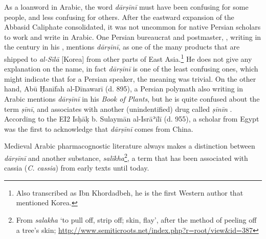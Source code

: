 As a loanword in Arabic, the word \textit{dārṣīnī} must have been confusing for some people, and less confusing for others. After the eastward expansion of the Abbasid Caliphate consolidated, it was not uncommon for native Persian scholars to work and write in Arabic. One Persian bureaucrat and postmaster, \textcite[71]{ibn_khurdadhbih_kitab_870}, writing in the  century in his , mentions \textit{dārṣīnī}, as one of the many products that are shipped to \textit{al-Sīlā} [Korea] from other parts of East Asia.\footnote{Also transcribed as Ibn Khordadbeh, he is the first Western author that mentioned Korea.} He does not give any explanation on the name, in fact \textit{dārṣīnī} is one of the least confusing ones, which might indicate that for a Persian speaker, the meaning was trivial. On the other hand, Abū Ḥanīfah al-Dīnawarī (d. 895), a Persian polymath also writing in Arabic mentions \textit{dārṣīnī} in his \textit{Book of Plants}, but he is quite confused about the term \textit{ṣīnī}, and associates with another (unindentified) drug called \textit{ṣīnīn} \parencite[210]{ad-dinawari_book_1974}. According to the \gls{EI2} Isḥāḳ b. Sulaymān al-Isrāʾīlī (d. 955), a scholar from Egypt was the first to acknowledge that \textit{dārṣīnī} comes from China.



Medieval Arabic pharmacognostic literature always makes a distinction between \textit{dārṣīnī} and another substance, 
\textit{salīkha}\footnote{From \textit{salakha} `to pull off, strip off; skin, flay', after the method of peeling off a tree's skin; \url{http://www.semiticroots.net/index.php?r=root/view&id=387}}, a term that has been associated with cassia (\textit{C. cassia}) from early texts until today. 

